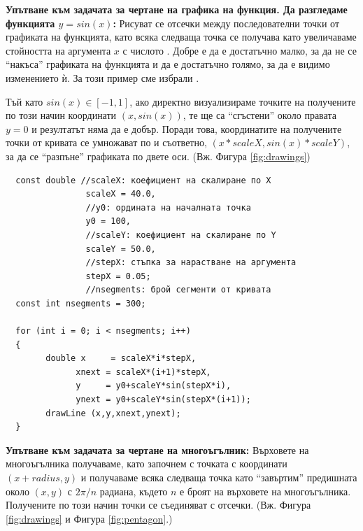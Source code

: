 {\begin{enumerate}[resume]
\begin{mdframed}[hidealllines=true,backgroundcolor=gray!20]
  \textbf {Упътване към задачата за чертане на графика на функция. Да разгледаме функцията $y=sin(x)$:} Рисуват се отсечки между последователни точки от графиката на функцията, като всяка следваща точка се получава като увеличаваме стойността на аргумента $x$ с числото . Добре е  да е достатъчно малко, за да не се ``накъса'' графиката на функцията и да е достатъчно голямо, за да е видимо изменението ѝ. За този пример сме избрали .
  
  Тъй като $sin(x)\in[-1,1]$, ако директно визуализираме точките на получените по този начин координати $(x,sin(x))$, те ще са ``сгъстени'' около правата $y=0$ и резултатът няма да е добър. Поради това, координатите на получените  точки от кривата се умножават по  и  съответно, $(x * scaleX,sin(x) * scaleY)$, за да се ``разпъне'' графиката по двете оси. (Вж. Фигура \ref{fig:drawings})\\

  \begin{mdframed}[hidealllines=true,backgroundcolor=lightgray!20]
  \begin{verbatim}
  const double //scaleX: коефициент на скалиране по X
                scaleX = 40.0,
                //y0: ордината на началната точка
                y0 = 100,
                //scaleY: коефициент на скалиране по Y
                scaleY = 50.0,
                //stepX: стъпка за нарастване на аргумента
                stepX = 0.05;
                //nsegments: брой сегменти от кривата
  const int nsegments = 300;

  for (int i = 0; i < nsegments; i++)
  {
        double x     = scaleX*i*stepX,
              xnext = scaleX*(i+1)*stepX,
              y     = y0+scaleY*sin(stepX*i),
              ynext = y0+scaleY*sin(stepX*(i+1));
        drawLine (x,y,xnext,ynext);
  }
  \end{verbatim}
  \end{mdframed}

  \end{mdframed}
  
\begin{mdframed}[hidealllines=true,backgroundcolor=gray!20]

\textbf {Упътване към задачата за чертане на многоъгълник:} Върховете на многоъгълника получаваме, като започнем с точката с координати $(x+radius,y)$ и получаваме всяка следваща точка като ``завъртим'' предишната около $(x,y)$ с $2\pi/n$ радиана, където $n$ е броят на върховете на многоъгълника. Получените по този начин точки се съединяват с отсечки. (Вж. Фигура \ref{fig:drawings} и Фигура \ref{fig:pentagon}.)\\


\end{mdframed}
\end{enumerate}}
